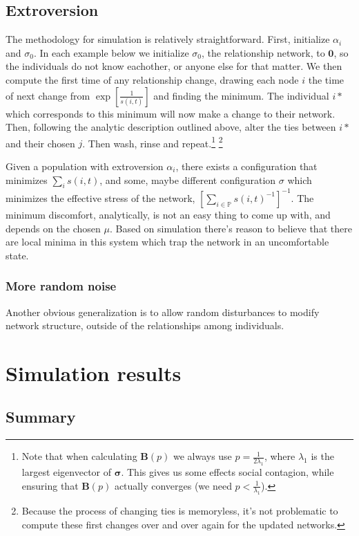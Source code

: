 \documentclass[]{article}
\begin{document}
	\subsection{Extroversion}
	The methodology for simulation is relatively straightforward.
	First, initialize ${\alpha_i}$ and $\sigma_0$.
	In each example below we initialize $\sigma_0$, the relationship network, to $\textbf{0}$, so the individuals do not know eachother, or anyone else for that matter.
	We then compute the first time of any relationship change, drawing each node $i$ the time of next change from $\exp\left[ \frac{1}{s(i,t)} \right]$ and finding the minimum. 
	The individual $i*$ which corresponds to this minimum will now make a change to their network.
	Then, following the analytic description outlined above, alter the ties between $i*$ and their chosen $j$. Then wash, rinse and repeat.\footnote{
		Note that when calculating $\textbf{B}(p)$ we always use $p = \frac{1}{2\lambda_1}$, where $\lambda_1$ is the largest eigenvector of $\boldsymbol{\sigma}$. This gives us some effects social contagion, while ensuring that $\textbf{B}(p)$ actually converges (we need $p < \frac{1}{\lambda_1}$).
	}
	\footnote{
	Because the process of changing ties is memoryless, it's not problematic to compute these first changes over and over again for the updated networks.
	}
	
	Given a population with extroversion ${\alpha_i}$, there exists a configuration that minimizes $\sum_i s(i,t)$, and some, maybe different configuration $\sigma$ which minimizes the effective stress of the network, $[\sum_{i\in\mathbb{P}} s(i,t)^{-1}]^{-1}$. The minimum discomfort, analytically, is not an easy thing to come up with, and depends on the chosen $\mu$. Based on simulation there's reason to believe that there are local minima in this system which trap the network in an uncomfortable state.
	
	\subsubsection{More random noise}
	Another obvious generalization is to allow random disturbances to modify network structure, outside of the relationships among individuals.
	
	\section{Simulation results}
	
	\subsection{Summary}
	
\end{document}
